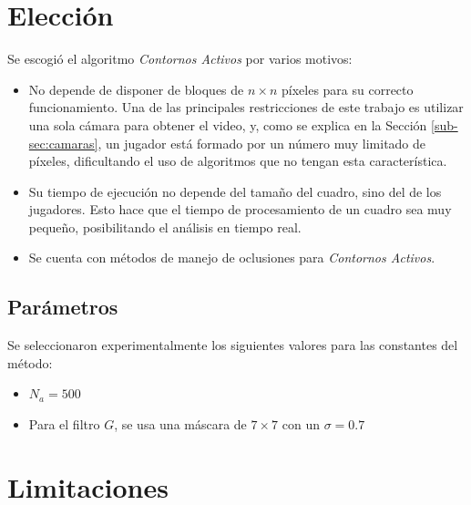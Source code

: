 \section{Elección}
\label{sec:eleccion}

Se escogió el algoritmo \emph{Contornos Activos} por varios motivos:
\begin{itemize}
    \item No depende de disponer de bloques de $n \times n$ píxeles para su
        correcto funcionamiento. Una de las principales restricciones de este
        trabajo es utilizar una sola cámara para obtener el video, y, como se
        explica en la Sección \ref{sub-sec:camaras}, un jugador está formado
        por un número muy limitado de píxeles, dificultando el uso de
        algoritmos que no tengan esta característica.

    \item Su tiempo de ejecución no depende del tamaño del cuadro, sino del
        de los jugadores. Esto hace que el tiempo de procesamiento de un cuadro
        sea muy pequeño, posibilitando el análisis en tiempo real.

    \item Se cuenta con métodos de manejo de oclusiones para
        \emph{Contornos Activos}\cite{paper-juliana}.

\end{itemize}

\subsection{Parámetros}

Se seleccionaron experimentalmente los siguientes valores para las constantes
del método:

\begin{itemize}
\item $N_a = 500$ 
\item Para el filtro $G$, se usa una máscara de $7 \times 7$ con un $\sigma = 0.7$ 
\end{itemize}

\section{Limitaciones}
\label{sec:ac-problemas}

